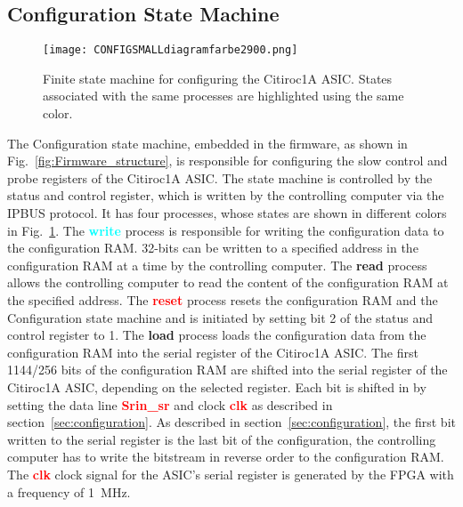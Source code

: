 \subsection{Configuration State Machine}
\begin{figure}[H]
    \centering
    \texttt{[image: CONFIGSMALLdiagramfarbe2900.png]}%
    \caption{Finite state machine for configuring the Citiroc1A ASIC.
    States associated with the same processes are highlighted using the same color.}
    \label{fig:Configuration_state_machine}
\end{figure}
The Configuration state machine, embedded 
in the firmware, as shown in Fig.~\ref{fig:Firmware_structure}, is responsible for configuring the slow control and probe registers of the Citiroc1A ASIC.
The state machine is controlled by the status and control register, which is written by the controlling computer via the IPBUS protocol.
It has four processes, whose states are shown in different colors in Fig.~\ref{fig:Configuration_state_machine}.
\newline
The \textbf{\textcolor{cyan}{write}} process is responsible for writing the configuration data to the configuration RAM.
32-bits can be written to a specified address in the configuration RAM at a time by the controlling computer.
\newline
The \textbf{\textcolor{yellow!60!black}{read}} process allows the controlling computer to read the content of the configuration RAM at the specified address.
\newline
The \textbf{\textcolor{red}{reset}} process resets the configuration RAM and the Configuration state machine and is initiated by setting bit 2 of the status and control register to 1.
\newline
The \textbf{\textcolor{VioletRed}{load}} process loads the configuration data from the configuration RAM into the serial register of the Citiroc1A ASIC. 
The first 1144/256 bits of the configuration RAM are shifted into the serial register of the Citiroc1A ASIC, depending on the selected register.
Each bit is shifted in by setting the data line \textbf{\textcolor{red}{Srin\_sr}} and clock \textbf{\textcolor{red}{clk}} as described in section~\ref{sec:configuration}.
As described in section~\ref{sec:configuration}, the first bit written to the serial register is the last bit of the configuration, the controlling computer has to write the bitstream in reverse order to the configuration RAM.
\newline
The \textbf{\textcolor{red}{clk}} clock signal for the ASIC's serial register is generated by the FPGA with a frequency of \SI{1}{\mega\hertz}.
